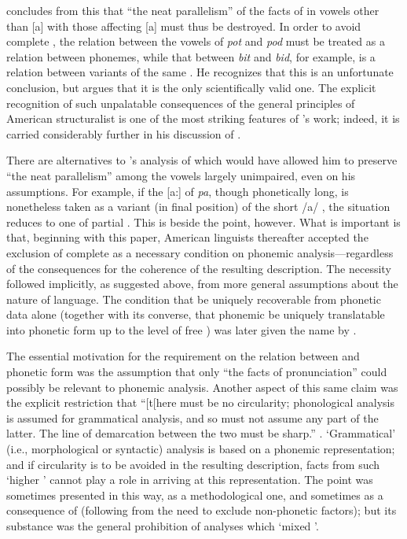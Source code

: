 \citet[284]{bloch41:overlapping} concludes from this that ``the neat
parallelism'' of the facts of  in vowels other than [a]
with those affecting [a] must thus be destroyed. In order to avoid
complete , the relation between the vowels of \emph{pot}
and \emph{pod} must be treated as a relation between phonemes, while
that between \emph{bit} and \emph{bid}, for example, is a relation
between variants of the same . He recognizes that this is an
unfortunate conclusion, but argues that it is the only scientifically
valid one. The explicit recognition of such unpalatable consequences
of the general principles of American structuralist  is
one of the most striking features of {\Bloch}'s work; indeed, it is
carried considerably further in his discussion of 
\citep{bloch50:japanese}.

There are alternatives to {\Bloch}'s analysis of  
which would have allowed him to preserve ``the neat parallelism''
among the vowels largely unimpaired, even on his assumptions. For
example, if the [a:] of \emph{pa}, though phonetically long, is
nonetheless taken as a variant (in final position) of the short /a/
, the situation reduces to one of partial . This is
beside the point, however. What is important is that, beginning with
this paper, American linguists thereafter accepted the exclusion of
complete  as a necessary condition on phonemic
analysis—regardless of the consequences for the coherence of the
resulting description. The necessity followed implicitly, as suggested
above, from more general assumptions about the nature of language. The
condition that  be uniquely recoverable from
phonetic data alone (together with its converse, that phonemic
 be uniquely translatable into phonetic form up to the
level of free ) was later given the name  by
\citet{harris44:yokuts}.

\largerpage
The essential motivation for the  requirement on the
relation between  and phonetic form was the
assumption that only ``the facts of pronunciation'' could possibly be
relevant to phonemic analysis. Another aspect of this same claim was
the explicit restriction that ``[t[here must be no circularity;
phonological analysis is assumed for grammatical analysis, and so must
not assume any part of the latter. The line of demarcation between the
two must be sharp.'' \citep[21]{hockett42:system}. `Grammatical'
(i.e., morphological or syntactic) analysis is based on a phonemic
representation; and if circularity is to be avoided in the resulting
description, facts from such `higher ' cannot play a role in
arriving at this representation. The point was sometimes presented in
this way, as a methodological one, and sometimes as a consequence of
 (following from the need to exclude non-phonetic factors);
but its substance was the general prohibition of analyses which `mixed
'.

